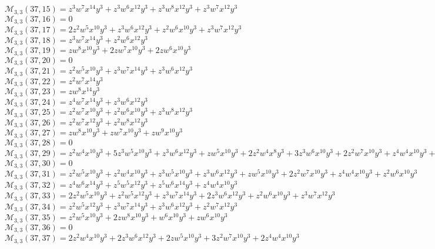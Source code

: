 \documentclass[12pt]{memoireuqam1.3}
\begin{document}
$\mathcal{M}_{3,3}(37,15)=z^3w^7x^{14}y^3+z^3w^6x^{12}y^3+z^3w^8x^{12}y^3+z^3w^7x^{12}y^3$\\
$\mathcal{M}_{3,3}(37,16)=0$\\
$\mathcal{M}_{3,3}(37,17)=2z^2w^5x^{10}y^3+z^3w^6x^{12}y^3+z^2w^6x^{10}y^3+z^3w^7x^{12}y^3$\\
$\mathcal{M}_{3,3}(37,18)=z^3w^7x^{14}y^3+z^2w^6x^{12}y^3$\\
$\mathcal{M}_{3,3}(37,19)=zw^8x^{10}y^3+2zw^7x^{10}y^3+2zw^6x^{10}y^3$\\
$\mathcal{M}_{3,3}(37,20)=0$\\
$\mathcal{M}_{3,3}(37,21)=z^2w^5x^{10}y^3+z^3w^7x^{14}y^3+z^3w^6x^{12}y^3$\\
$\mathcal{M}_{3,3}(37,22)=z^2w^7x^{14}y^3$\\
$\mathcal{M}_{3,3}(37,23)=zw^8x^{14}y^3$\\
$\mathcal{M}_{3,3}(37,24)=z^4w^7x^{14}y^3+z^3w^6x^{12}y^3$\\
$\mathcal{M}_{3,3}(37,25)=z^2w^7x^{10}y^3+z^2w^6x^{10}y^3+z^3w^8x^{12}y^3$\\
$\mathcal{M}_{3,3}(37,26)=z^2w^7x^{12}y^3+z^2w^8x^{12}y^3$\\
$\mathcal{M}_{3,3}(37,27)=zw^8x^{10}y^3+zw^7x^{10}y^3+zw^9x^{10}y^3$\\
$\mathcal{M}_{3,3}(37,28)=0$\\
$\mathcal{M}_{3,3}(37,29)=z^2w^4x^{10}y^3+5z^3w^5x^{10}y^3+z^3w^6x^{12}y^3+zw^5x^{10}y^3+2z^2w^4x^8y^3+3z^3w^6x^{10}y^3+2z^2w^7x^{10}y^3+z^4w^4x^{10}y^3+z^2w^5x^8y^3$\\
$\mathcal{M}_{3,3}(37,30)=0$\\
$\mathcal{M}_{3,3}(37,31)=z^2w^5x^{10}y^3+z^2w^4x^{10}y^3+z^3w^5x^{10}y^3+z^3w^6x^{12}y^3+zw^5x^{10}y^3+2z^2w^7x^{10}y^3+z^4w^4x^{10}y^3+z^2w^6x^{10}y^3$\\
$\mathcal{M}_{3,3}(37,32)=z^4w^6x^{14}y^3+z^5w^5x^{12}y^3+z^5w^6x^{14}y^3+z^4w^4x^{10}y^3$\\
$\mathcal{M}_{3,3}(37,33)=2z^2w^5x^{10}y^3+z^2w^5x^{12}y^3+z^3w^7x^{14}y^3+2z^3w^6x^{12}y^3+z^2w^6x^{10}y^3+z^3w^7x^{12}y^3$\\
$\mathcal{M}_{3,3}(37,34)=z^2w^5x^{12}y^3+z^3w^7x^{14}y^3+z^3w^6x^{12}y^3+z^2w^7x^{12}y^3$\\
$\mathcal{M}_{3,3}(37,35)=z^2w^5x^{10}y^3+2zw^8x^{10}y^3+w^6x^{10}y^3+zw^6x^{10}y^3$\\
$\mathcal{M}_{3,3}(37,36)=0$\\
$\mathcal{M}_{3,3}(37,37)=2z^2w^4x^{10}y^3+2z^3w^6x^{12}y^3+2zw^5x^{10}y^3+3z^2w^7x^{10}y^3+2z^4w^4x^{10}y^3$\\
\end{document}
